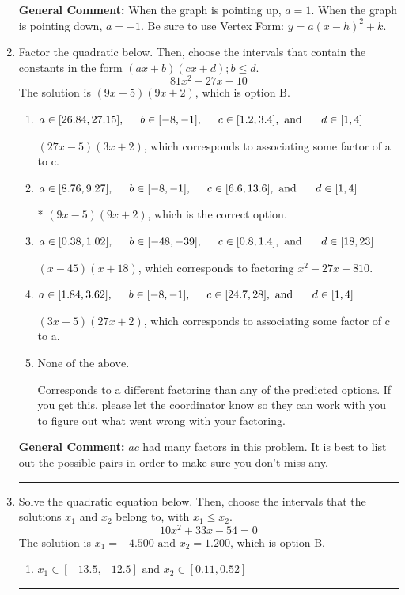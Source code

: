 \documentclass{extbook}[14pt]
\newcommand{\litem}[1]{\item #1

\rule{\textwidth}{0.4pt}}
\begin{document}
\begin{enumerate}
{\textbf{General Comment:} When the graph is pointing up, $a=1$. When the graph is pointing down, $a=-1$. Be sure to use Vertex Form: $y = a(x-h)^2+k$.
}
\litem{
Factor the quadratic below. Then, choose the intervals that contain the constants in the form $(ax+b)(cx+d); b \leq d.$
\[ 81x^{2} -27 x -10 \]The solution is \( (9x -5)(9x + 2) \), which is option B.\begin{enumerate}[label=\Alph*.]
\item \( a \in [26.84, 27.15], \hspace*{5mm} b \in [-8, -1], \hspace*{5mm} c \in [1.2, 3.4], \text{ and } \hspace*{5mm} d \in [1, 4] \)

 $(27x -5)(3x + 2)$, which corresponds to associating some factor of a to c.
\item \( a \in [8.76, 9.27], \hspace*{5mm} b \in [-8, -1], \hspace*{5mm} c \in [6.6, 13.6], \text{ and } \hspace*{5mm} d \in [1, 4] \)

* $(9x -5)(9x + 2)$, which is the correct option.
\item \( a \in [0.38, 1.02], \hspace*{5mm} b \in [-48, -39], \hspace*{5mm} c \in [0.8, 1.4], \text{ and } \hspace*{5mm} d \in [18, 23] \)

 $(x -45)(x + 18)$, which corresponds to factoring $x^{2} -27 x -810$.
\item \( a \in [1.84, 3.62], \hspace*{5mm} b \in [-8, -1], \hspace*{5mm} c \in [24.7, 28], \text{ and } \hspace*{5mm} d \in [1, 4] \)

 $(3x -5)(27x + 2)$, which corresponds to associating some factor of c to a.
\item \( \text{None of the above.} \)

 Corresponds to a different factoring than any of the predicted options. If you get this, please let the coordinator know so they can work with you to figure out what went wrong with your factoring.
\end{enumerate}

\textbf{General Comment:} $ac$ had many factors in this problem. It is best to list out the possible pairs in order to make sure you don't miss any.
}
\litem{
Solve the quadratic equation below. Then, choose the intervals that the solutions $x_1$ and $x_2$ belong to, with $x_1 \leq x_2$.
\[ 10x^{2} +33 x -54 = 0 \]The solution is \( x_1 = -4.500 \text{ and } x_2 = 1.200 \), which is option B.\begin{enumerate}[label=\Alph*.]
\item \( x_1 \in [-13.5, -12.5] \text{ and } x_2 \in [0.11, 0.52] \)


\end{enumerate}}
\end{enumerate}
\end{document}
